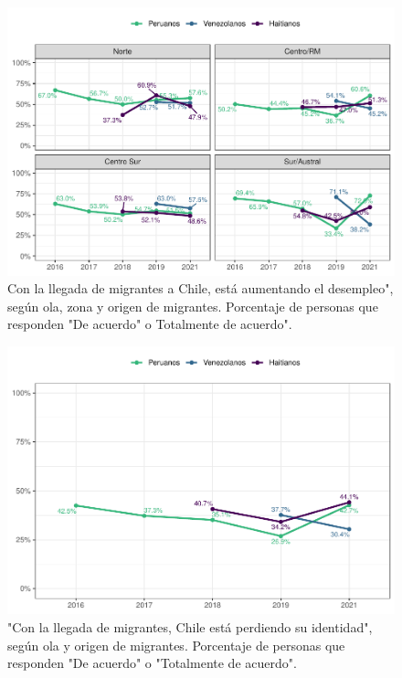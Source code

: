 \documentclass[
  12pt,
]{book}
\begin{document}
\begin{figure}

{\centering \includegraphics{reporte-elsoc_files/figure-latex/amen1-zona-1} 

}

\caption{Con la llegada de migrantes a Chile, está aumentando el desempleo", según ola, zona y origen de migrantes. Porcentaje de personas que responden "De acuerdo" o Totalmente de acuerdo".}\label{fig:amen1-zona}
\end{figure}

\begin{figure}

{\centering \includegraphics{reporte-elsoc_files/figure-latex/amen2-wave-1} 

}

\caption{"Con la llegada de migrantes, Chile está perdiendo su identidad", según ola y origen de migrantes. Porcentaje de personas que responden "De acuerdo" o "Totalmente de acuerdo".}\label{fig:amen2-wave}
\end{figure}
\end{document}

